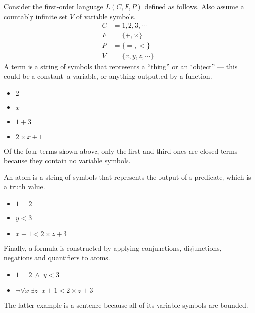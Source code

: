 Consider the first-order language \(L(C, F, P)\) defined as follows. Also assume a countably infinite set \(V\) of variable symbols.
%
\begin{align*}
    C &= 1, 2, 3, \cdots \tag{constant symbols}\\
    F &= \{+, \times\} \tag{function symbols, both binary}\\
    P &= \{=, <\} \tag{predicate symbols, both binary}\\
    V &= \{x, y, z, \cdots\} \tag{variable symbols}
\end{align*}
%
A term is a string of symbols that represents a ``thing'' or an ``object'' --- this could be a constant, a variable, or anything outputted by a function.
%
\begin{itemize}
    \item \(2\)
    \item \(x\)
    \item \(1 + 3\)
    \item \(2 \times x + 1\)
\end{itemize}
%
Of the four terms shown above, only the first and third ones are closed terms because they contain no variable symbols.

An atom is a string of symbols that represents the output of a predicate, which is a truth value.
%
\begin{itemize}
    \item \(1 = 2\)
    \item \(y < 3\)
    \item \(x + 1 < 2 \times z + 3\)
\end{itemize}
%
Finally, a formula is constructed by applying conjunctions, disjunctions, negations and quantifiers to atoms.
%
\begin{itemize}
    \item \(1 = 2 \;\land\; y < 3\)
    \item \(\neg \forall x\; \exists z\;\; x + 1 < 2 \times z + 3\)
\end{itemize}
%
The latter example is a sentence because all of its variable symbols are bounded.

